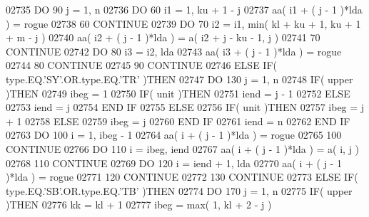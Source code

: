 \begin{DoxyCode}
02735          \textcolor{keywordflow}{DO} 90 j = 1, n
02736             \textcolor{keywordflow}{DO} 60 i1 = 1, ku + 1 - j
02737                aa( i1 + ( j - 1 )*lda ) = rogue
02738    60       \textcolor{keywordflow}{CONTINUE}
02739             \textcolor{keywordflow}{DO} 70 i2 = i1, min( kl + ku + 1, ku + 1 + m - j )
02740                aa( i2 + ( j - 1 )*lda ) = a( i2 + j - ku - 1, j )
02741    70       \textcolor{keywordflow}{CONTINUE}
02742             \textcolor{keywordflow}{DO} 80 i3 = i2, lda
02743                aa( i3 + ( j - 1 )*lda ) = rogue
02744    80       \textcolor{keywordflow}{CONTINUE}
02745    90    \textcolor{keywordflow}{CONTINUE}
02746       \textcolor{keywordflow}{ELSE} \textcolor{keywordflow}{IF}( type.EQ.\textcolor{stringliteral}{'SY'}.OR.type.EQ.\textcolor{stringliteral}{'TR'} )\textcolor{keywordflow}{THEN}
02747          \textcolor{keywordflow}{DO} 130 j = 1, n
02748             \textcolor{keywordflow}{IF}( upper )\textcolor{keywordflow}{THEN}
02749                ibeg = 1
02750                \textcolor{keywordflow}{IF}( unit )\textcolor{keywordflow}{THEN}
02751                   iend = j - 1
02752                \textcolor{keywordflow}{ELSE}
02753                   iend = j
02754 \textcolor{keywordflow}{               END IF}
02755             \textcolor{keywordflow}{ELSE}
02756                \textcolor{keywordflow}{IF}( unit )\textcolor{keywordflow}{THEN}
02757                   ibeg = j + 1
02758                \textcolor{keywordflow}{ELSE}
02759                   ibeg = j
02760 \textcolor{keywordflow}{               END IF}
02761                iend = n
02762 \textcolor{keywordflow}{            END IF}
02763             \textcolor{keywordflow}{DO} 100 i = 1, ibeg - 1
02764                aa( i + ( j - 1 )*lda ) = rogue
02765   100       \textcolor{keywordflow}{CONTINUE}
02766             \textcolor{keywordflow}{DO} 110 i = ibeg, iend
02767                aa( i + ( j - 1 )*lda ) = a( i, j )
02768   110       \textcolor{keywordflow}{CONTINUE}
02769             \textcolor{keywordflow}{DO} 120 i = iend + 1, lda
02770                aa( i + ( j - 1 )*lda ) = rogue
02771   120       \textcolor{keywordflow}{CONTINUE}
02772   130    \textcolor{keywordflow}{CONTINUE}
02773       \textcolor{keywordflow}{ELSE} \textcolor{keywordflow}{IF}( type.EQ.\textcolor{stringliteral}{'SB'}.OR.type.EQ.\textcolor{stringliteral}{'TB'} )\textcolor{keywordflow}{THEN}
02774          \textcolor{keywordflow}{DO} 170 j = 1, n
02775             \textcolor{keywordflow}{IF}( upper )\textcolor{keywordflow}{THEN}
02776                kk = kl + 1
02777                ibeg = max( 1, kl + 2 - j )

\end{DoxyCode}
